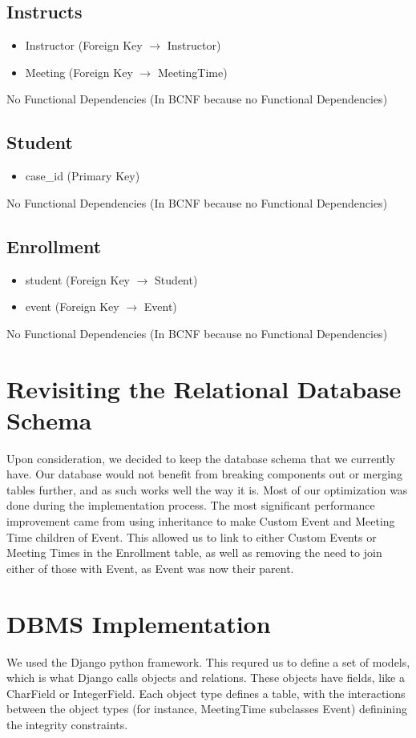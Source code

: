 \documentclass[pdftex,12pt,letter]{article}
\begin{document}
\subsection*{Instructs}
\begin{itemize}
\item Instructor (Foreign Key $\rightarrow$ Instructor)
\item Meeting (Foreign Key $\rightarrow$ MeetingTime)
\end{itemize}
No Functional Dependencies (In BCNF because no Functional Dependencies)
\subsection*{Student}
\begin{itemize}
\item case\_id (Primary Key)
\end{itemize}
No Functional Dependencies (In BCNF because no Functional Dependencies)
\subsection*{Enrollment}
\begin{itemize}
\item student (Foreign Key $\rightarrow$ Student)
\item event (Foreign Key $\rightarrow$ Event)
\end{itemize}
No Functional Dependencies (In BCNF because no Functional Dependencies)
\section{Revisiting the Relational Database Schema}
Upon consideration, we decided to keep the database schema that we currently have. Our database would not benefit from breaking components out or merging tables further, and as such works well the way it is. Most of our optimization was done during the implementation process. The most significant performance improvement came from using inheritance to make Custom Event and Meeting Time children of Event. This allowed us to link to either Custom Events or Meeting Times in the Enrollment table, as well as removing the need to join either of those with Event, as Event was now their parent.
\section{DBMS Implementation}
We used the Django python framework.  This requred us to define a set of models, which is what Django calls objects and relations.  These objects have fields, like a CharField or IntegerField.  Each object type defines a table, with the interactions between the object types (for instance, MeetingTime subclasses Event) definining the integrity constraints.  
\end{document}
